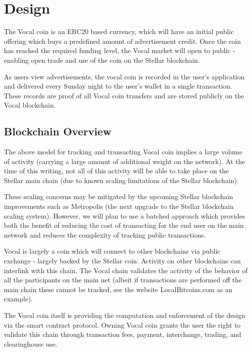 \documentclass[conference]{IEEEtran}
\begin{document}
    \section{Design}

    The Vocal coin is an ERC20 based currency, which will have an initial public offering which buys a predefined amount of advertisement credit. Once the coin has reached the required funding level, the Vocal market will open to public - enabling open trade and use of the coin on the Stellar blockchain.

    As users view advertisements, the vocal coin is recorded in the user's application and delivered every Sunday night to the user's wallet in a single transaction. 
    These records are proof of all Vocal coin transfers and are stored publicly on the Vocal blockchain. 


    \subsection{Blockchain Overview}

    The above model for tracking and transacting Vocal coin implies a large volume of activity (carrying a large amount of additional weight on the network). At the time of this writing, not all of this activity will be able to take place on the Stellar main chain (due to known scaling limitations of the Stellar blockchain).


    These scaling concerns may be mitigated by the upcoming Stellar blockchain improvements such as Metropolis (the next upgrade to the Stellar blockchain scaling system). However, we will plan to use a batched approach which provides both the benefit of reducing the cost of transacting for the end user on the main network and reduces the complexity of tracking public transactions.

   Vocal is largely a coin which will connect to other blockchains via public exchange - largely backed by the Stellar coin. Activity on other blockchains can interlink with this chain. The Vocal chain validates the activity of the behavior of all the participants on the main net (albeit if transactions are performed off the main chain these cannot be tracked, see the website LocalBitcoins.com as an example).

    The Vocal coin itself is providing the computation and enforcement of the design via the smart contract protocol. Owning Vocal coin grants the user the right to validate this chain through transaction fees, payment, interchange, trading, and clearinghouse use. 
\end{document}
